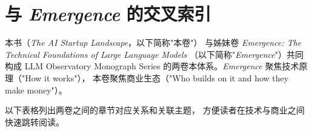 \clearpage
\section{与 \textit{Emergence} 的交叉索引}
\label{sec:appendix-emergence-xref}

本书（\textit{The AI Startup Landscape}，以下简称"本卷"）
与姊妹卷 \textit{Emergence: The Technical Foundations of Large Language Models}
（以下简称"\textit{Emergence}"）共同构成 LLM Observatory Monograph Series
的两卷本体系。\textit{Emergence} 聚焦技术原理（"How it works"），
本卷聚焦商业生态（"Who builds on it and how they make money"）。

以下表格列出两卷之间的章节对应关系和关联主题，
方便读者在技术与商业之间快速跳转阅读。

\bigskip

